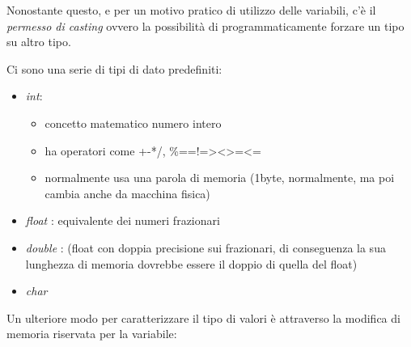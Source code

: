 \documentclass[
  paper=a4,
  oneside  ,captions=tableheading
]{scrbook}
\providecommand{\tightlist}{%
  \setlength{\itemsep}{0pt}\setlength{\parskip}{0pt}}
\begin{document}
Nonostante questo, e per un motivo pratico di utilizzo delle variabili,
c'è il \emph{permesso di casting} ovvero la possibilità di
programmaticamente forzare un tipo su altro tipo.

Ci sono una serie di tipi di dato predefiniti:

\begin{itemize}
\tightlist
\item
  \emph{int}:

  \begin{itemize}
  \tightlist
  \item
    concetto matematico numero intero
  \item
    ha operatori come +-*/,
    \%==!=\textgreater\textless\textgreater=\textless=
  \item
    normalmente usa una parola di memoria (1byte, normalmente, ma poi
    cambia anche da macchina fisica)
  \end{itemize}
\item
  \emph{float} : equivalente dei numeri frazionari
\item
  \emph{double} : (float con doppia precisione sui frazionari, di
  conseguenza la sua lunghezza di memoria dovrebbe essere il doppio di
  quella del float)
\item
  \emph{char}
\end{itemize}

Un ulteriore modo per caratterizzare il tipo di valori è attraverso la
modifica di memoria riservata per la variabile:
\end{document}
